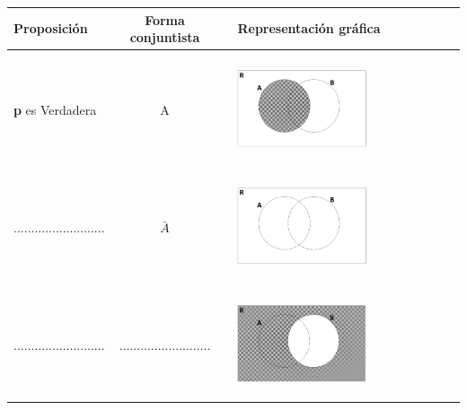 \documentclass[12pt]{article}
\theoremstyle{definition}
\theoremstyle{remark}
\begin{document}
\begin{enumerate}
\begin{table}[ H]
\begin{center} 
\begin{tabular} { l c c l }
\textbf{Proposición}&\textbf{Forma conjuntista}& & \textbf{Representación gráfica}\\ \hline  \\ 
\textbf{p} es Verdadera& A& & \begin{minipage}{5cm} \begin{center} 
\includegraphics[width=0.6\textwidth]{tp3_fig3} 
\end{center}
\end{minipage}\\ \\ 
$..........................$&$\bar{A}$ & & \begin{minipage}{5cm}  \begin{center} 
\includegraphics[width=0.6\textwidth]{tp3_fig6} 
\end{center}
\end{minipage}\\ \\   
$..........................$&$..........................$ & & \begin{minipage}{5cm} \begin{center} 
\includegraphics[width=0.6\textwidth]{tp3_fig4} 

\end{center}
\end{minipage}
\end{tabular}
\end{center}
\end{table}
\end{enumerate}
\end{document}
